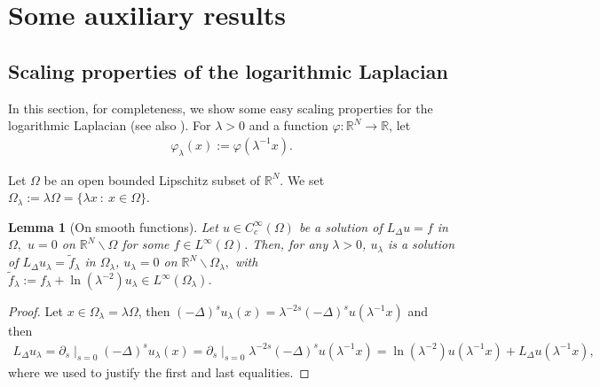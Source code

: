 \documentclass[11pt]{article}
\newcommand{\R}{\mathbb{R}}
\numberwithin{equation}{section}
\newtheorem{lemma}[theorem]{Lemma}
\begin{document}
\appendix


\section{Some auxiliary results}

\subsection{Scaling properties of the logarithmic Laplacian}\label{scal:sec}

In this section, for completeness, we show some easy scaling properties for the logarithmic Laplacian (see also \cite[Lemma 2.5]{LW21}).  For $\lambda>0$ and a function $\varphi:\R^N\to\R$, let
\begin{align*}
\varphi_\lambda(x):=\varphi(\lambda^{-1} x).
\end{align*}

Let $\Omega$ be an open bounded Lipschitz subset of $\R^N$. We set $\Omega_\lambda:=\lambda \Omega=\{\lambda x\::\: x\in \Omega\}$.

\begin{lemma}[On smooth functions]\label{0:sc:lem}
Let $u\in C_c^\infty(\Omega)$ be a solution of $L_\Delta u = f$ in $\Omega,$ $u=0$ on $\R^N\backslash \Omega$ for some $f\in L^\infty(\Omega)$. Then, for any $\lambda>0$, $u_\lambda$ is a solution of $L_\Delta u_\lambda =\widetilde f_\lambda$ in $\Omega_\lambda$, $u_\lambda=0$ on $\R^N\backslash \Omega_\lambda,$ with $\widetilde f_\lambda:= f_\lambda+\ln(\lambda^{-2}) u_\lambda\in L^\infty(\Omega_\lambda)$.
\end{lemma}
\begin{proof}
Let $x\in  \Omega_\lambda=\lambda \Omega$, then $(-\Delta)^s u_\lambda(x) = \lambda^{-2s}(-\Delta)^s u(\lambda^{-1}x)$ and then
\begin{align*}
    L_\Delta u_\lambda 
    = \partial_s\mid_{s=0}(-\Delta)^s u_\lambda(x) 
    = \partial_s\mid_{s=0} \lambda^{-2s}(-\Delta)^s u(\lambda^{-1}x)
    = \ln(\lambda^{-2}) u(\lambda^{-1}x)+L_\Delta  u(\lambda^{-1}x),
\end{align*}
where we used \cite[Theorem 1.1]{CW19} to justify the first and last equalities.
\end{proof}
\end{document}
